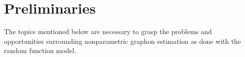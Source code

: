 \documentclass[11pt]{report} %
\begin{document}
\chapter{Preliminaries}
The topics mentioned below are necessary to grasp the problems and opportunities surrounding nonparametric graphon estimation as done with the random function model.
\end{document}
